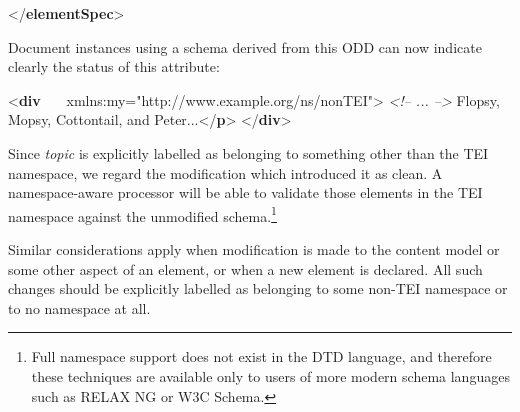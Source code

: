 \begin{shaded}
\hspace*{1em}\hspace*{1em}\mbox{}\newline 
\hspace*{1em}\mbox{}\newline 
{}\mbox{}\newline 
{</\textbf{elementSpec}>}\end{shaded}\egroup\par \par
Document instances using a schema derived from this ODD can now indicate clearly the status of this attribute: \par\bgroup{}\exampleFont \begin{shaded}\noindent\mbox{}{<\textbf{div}\mbox{}\newline 
   xmlns:my="http://www.example.org/ns/nonTEI">}\mbox{}\newline 
\textit{<!-- ... -->}\mbox{}\newline 
{}Flopsy, Mopsy, Cottontail, and Peter...{</\textbf{p}>}\mbox{}\newline 
{</\textbf{div}>}\end{shaded}\egroup\par \par
Since {\itshape topic} is explicitly labelled as belonging to something other than the TEI namespace, we regard the modification which introduced it as clean. A namespace-aware processor will be able to validate those elements in the TEI namespace against the unmodified schema.\footnote{Full namespace support does not exist in the DTD language, and therefore these techniques are available only to users of more modern schema languages such as RELAX NG or W3C Schema.}\par
Similar considerations apply when modification is made to the content model or some other aspect of an element, or when a new element is declared. All such changes should be explicitly labelled as belonging to some non-TEI namespace or to no namespace at all.\par
